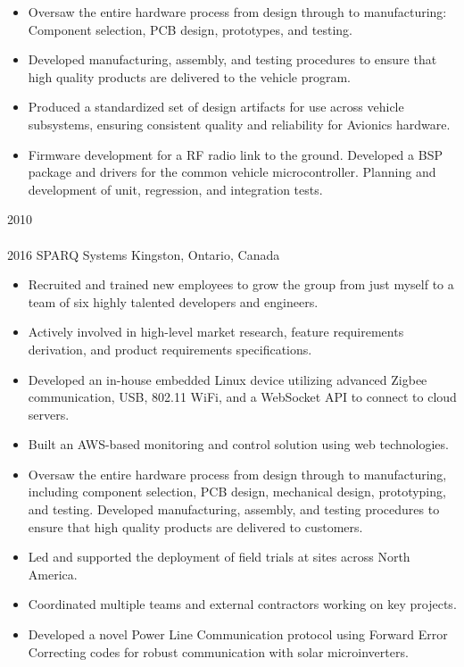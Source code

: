 \begin{entrylist}
{\begin{itemize}[leftmargin=12pt]
\end{itemize}
\begin{itemize}[leftmargin=12pt]
  \item Oversaw the entire hardware process from design through to manufacturing: Component selection, PCB design, prototypes, and testing.
  \item Developed manufacturing, assembly, and testing procedures to ensure that high quality products are delivered to the vehicle program.
  \item Produced a standardized set of design artifacts for use across vehicle subsystems, ensuring consistent quality and reliability for Avionics hardware.
  \item Firmware development for a RF radio link to the ground. Developed a BSP package and drivers for the common vehicle microcontroller. Planning and development of unit, regression, and integration tests.
\end{itemize}
}
\entry
  {2010\\\faChevronDown\\2016}
  {SPARQ Systems}
  {Kingston, Ontario, Canada}
  {
\begin{itemize}[leftmargin=12pt]
  \item Recruited and trained new employees to grow the group from just myself to a team of six highly talented developers and engineers.
  \item Actively involved in high-level market research, feature requirements derivation, and product requirements specifications.
  \item Developed an in-house embedded Linux device utilizing advanced Zigbee communication, USB, 802.11 WiFi, and a WebSocket API to connect to cloud servers.
  \item Built an AWS-based monitoring and control solution using web technologies.
  \item Oversaw the entire hardware process from design through to manufacturing, including component selection, PCB design, mechanical design, prototyping, and testing. Developed manufacturing, assembly, and testing procedures to ensure that high quality products are delivered to customers.
  \item Led and supported the deployment of field trials at sites across North America.
  \item Coordinated multiple teams and external contractors working on key projects.
  \item Developed a novel Power Line Communication protocol using Forward Error Correcting codes for robust communication with solar microinverters.
\end{itemize}
}
\end{entrylist}